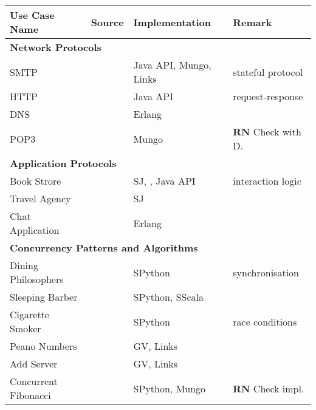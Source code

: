 \newcommand{\JavaAPI}{Java API}
\newcommand{\Erlang}{Erlang}
\newcommand{\SJ}{SJ}
\newcommand{\SPython}{SPython}
\newcommand{\SScala}{SScala}
\newcommand{\TypeState}{Mungo}
\newcommand{\MPI}{MPI}
\newcommand{\Sill}{Sill}
\newcommand{\GV}{GV}
\newcommand{\Links}{Links}
\newcommand{\ESJ}{Eventful Session Java}

\newcommand{\rumi}[1]{$\mathbf{RN}$ {\color{red} #1} }


\begin{table}
\begin{tabular}{|l|l|l|l|}
	\hline
	Use Case Name & Source & Implementation & Remark
	\\

	\hline
	\hline
	\multicolumn{4}{|l|}{ \textbf{Network Protocols}}
	\\
	\hline
	SMTP & \cite{SMTP} & \JavaAPI, \TypeState, \Links & stateful protocol
	\\ 
	HTTP & \cite{HTTP} & \JavaAPI & request-response
	\\
	DNS & \cite{DNS} & \Erlang &
	\\
	POP3 & \cite{POP3} & \TypeState & \rumi{Check with D.}
	\\ 

	\hline
	\hline
	\multicolumn{4}{|l|}{ \textbf{Application Protocols}}
	\\
	\hline
	Book Strore & \cite{BookStore} & \SJ, \Mungo, \JavaAPI  & interaction logic
	\\ 
	Travel Agency & \cite{TravelAgency} & \SJ &
	\\
	Chat Application & \cite{ChatApplication} & \Erlang &
	\\

	\hline
	\hline
	\multicolumn{4}{|l|}{ \textbf{Concurrency Patterns  and Algorithms}}
	\\
	\hline
	Dining Philosophers & \cite{Savina} & \SPython  & synchronisation
	\\ 
	Sleeping Barber & \cite{Savina} & \SPython, \SScala &
	\\
	Cigarette Smoker & \cite{Savina} & \SPython & race conditions
	\\
	Peano Numbers & \cite{} & \GV, \Links &
	\\
	Add Server & \cite{} & \GV, \Links &
	\\
	Concurrent Fibonacci & \cite{Fibonacci} & \SPython, \TypeState & \rumi{Check impl.}
	\\ 


\end{tabular}
\end{table}
